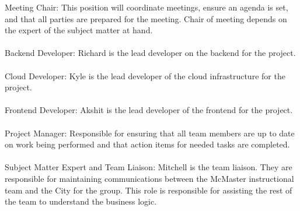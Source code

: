 \documentclass{article}
\begin{document}
Meeting Chair: This position will coordinate meetings, ensure an
agenda is set, and that all parties are
prepared for the meeting. Chair of meeting depends on the expert of
the subject matter at hand.\\
\\
Backend Developer: Richard is the lead developer on the backend for
the project.\\
\\
Cloud Developer: Kyle is the lead developer of the cloud
infrastructure for the project.\\
\\
Frontend Developer: Akshit is the lead developer of the frontend for
the project.\\
\\
Project Manager: Responsible for ensuring that all team members are
up to date on work being performed
and that action items for needed tasks are completed.\\
\\
Subject Matter Expert and Team Liaison: Mitchell is the team liaison.
They are responsible for maintaining communications between the
McMaster instructional team and the City for the group. This role is
responsible for assisting the rest of the team to understand
the business logic. \\
\end{document}
